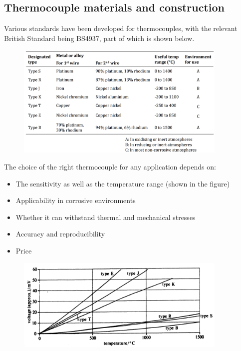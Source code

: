 \documentclass[class=report, crop=false, 12pt,a4paper]{standalone}
\begin{document}
\subsection{Thermocouple materials and construction}
Various standards have been developed for thermocouples, with the relevant British Standard being BS4937, part of which is shown below.
\begin{figure}[H]
  \centering
  \includegraphics[width = 0.9\textwidth]{../img/Mdiagram64.png}
\end{figure}
The choice of the right thermocouple for any application depends on:
\begin{itemize}
  \item The sensitivity as well as the temperature range (shown in the figure)
  \item Applicability in corrosive environments
  \item Whether it can withstand thermal and mechanical stresses
  \item Accuracy and reproducibility
  \item Price
\end{itemize}
\begin{figure}[H]
  \centering
  \includegraphics[width = 0.9\textwidth]{../img/Mdiagram65.png}
\end{figure}
\end{document}
